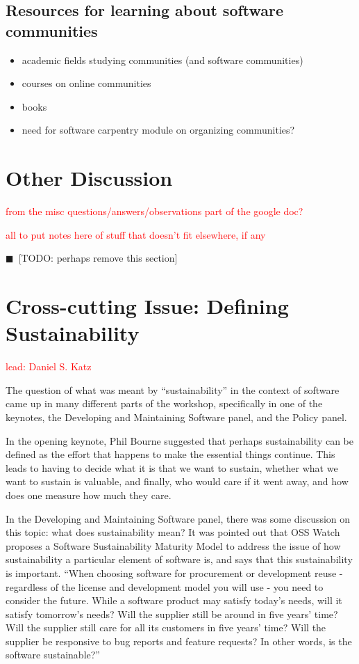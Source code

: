 \documentclass[11pt, oneside]{amsart}
\newcommand{\todo}[1]{{\color{blue}$\blacksquare$~\textsf{[TODO: #1]}}}
\newcommand{\note}[1]{ {\textcolor{red}    { #1 }}}
\begin{document}
\subsection{Resources for learning about software communities}
\begin{itemize}
\item academic fields studying communities (and software communities)
\item courses on online communities
\item books
\item need for software carpentry module on organizing communities?
\end{itemize}

\section{Other Discussion} \label{sec:other}

\note{from the misc questions/answers/observations part of the google doc?}

\note{all to put notes here of stuff that doesn't fit elsewhere, if any}

\todo{perhaps remove this section}


\section{Cross-cutting Issue: Defining Sustainability}  \label{sec:cross-cutting}

\note{lead: Daniel S. Katz}

The question of what was meant by ``sustainability'' in the context of software
came up in many different parts of the workshop, specifically in one of the
keynotes, the Developing and Maintaining Software panel, and the Policy panel.

In the opening keynote, Phil Bourne suggested that perhaps sustainability can be defined
as the effort that happens to make the essential things continue. This leads to
having to decide what it is that we want to sustain, whether what we want to sustain is
valuable, and finally, who would care if it went away, and how does one measure
how much they care.

In the Developing and Maintaining Software panel, there was some discussion
on this topic: what does sustainability mean? It was pointed out that
OSS Watch proposes a Software Sustainability Maturity Model to address
the issue of how sustainability a particular element of software is, and says
that this sustainability is important. ``When choosing
software for procurement or development reuse - regardless of the
license and development model you will use - you need to consider
the future. While a software product may satisfy today's needs, will
it satisfy tomorrow's needs? Will the supplier still be around in
five years' time? Will the supplier still care for all its customers
in five years' time? Will the supplier be responsive to bug reports
and feature requests? In other words, is the software sustainable?''~\cite{OSS-ssmm-web}
\end{document}
